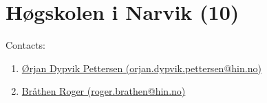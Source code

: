 \section{Høgskolen i Narvik (10)}
\label{sec:HiN}

Contacts:
\begin{enumerate}
 \item {}\href{mailto:orjan.dypvik.pettersen@hin.no}{Ørjan Dypvik Pettersen (orjan.dypvik.pettersen@hin.no)}
 \item {}\href{mailto:roger.brathen@hin.no}{Bråthen Roger (roger.brathen@hin.no)}
\end{enumerate}

